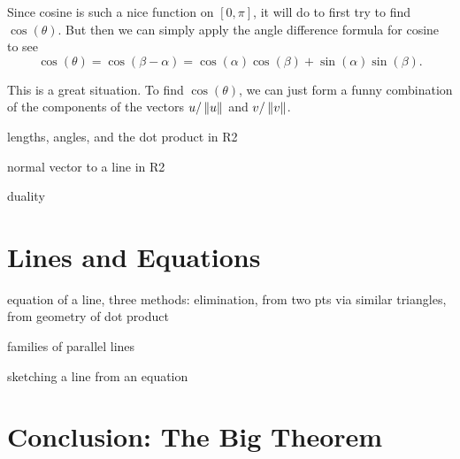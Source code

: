 \documentclass[00-livre-main.tex]{subfiles}
\begin{document}
Since cosine is such a nice function on $[0,\pi]$, it will do to first try to find $\cos(\theta)$. But then we can simply apply the angle difference formula for cosine to see
\[
\cos(\theta) = \cos(\beta - \alpha) = \cos(\alpha)\cos(\beta) + \sin(\alpha)\sin(\beta).
\]

This is a great situation. To find $\cos(\theta)$, we can just form a funny combination of the components of the vectors $u/\left\|u\right\|$ and $v/\left\|v\right\|$.



\begin{compactitem}
\item lengths, angles, and the dot product in R2
\item normal vector to a line in R2
\item duality
\end{compactitem}





\section*{Lines and Equations}
\begin{compactitem}
\item equation of a line, three methods: elimination, from two pts via similar triangles, from geometry of dot product
\item families of parallel lines
\item sketching a line from an equation
\end{compactitem}

\section*{Conclusion: The Big Theorem}
\end{document}
